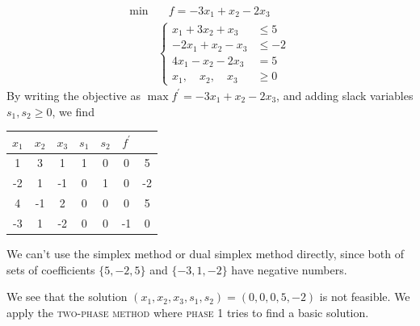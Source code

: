\begin{example}
    \begin{align}
        \min &\quad f = -3x_1 +x_2-2x_3\nonumber \\
        & \left\lbrace\begin{array}{ll}
        x_1+3x_2+x_3 &\le 5  \\
        -2x_1 + x_2 - x_3&\le -2\\
        4x_1 - x_2 -2x_3 & = 5\\
        x_1,\quad x_2,\quad x_3 &\ge 0
        \end{array}   \right.\label{1.11}
    \end{align}
    By writing the objective as $\max f^{\prime} = -3x_1+x_2-2x_3$, and adding slack variables $s_1, s_2\ge 0$, we find
    \begin{table}[H]
        \centering
        \begin{tabular}{|cccccc|c|}
        \hline
        $x_1$ & $x_2$ & $x_3$ & $s_1$ & $s_2$ & $f^{\prime}$ & \\ \hline
        1 & 3 & 1 & 1 & 0 & 0 & 5 \\
        -2 & 1 & -1 & 0 & 1 & 0 & -2\\ 
        4 & -1 & 2 & 0 & 0 & 0 & 5\\ \hline
        -3 & 1 & -2 & 0 & 0 & -1 & 0 \\ \hline
        \end{tabular}
        \label{tab-11-1}
    \end{table}
\end{example}

We can't use the simplex method or dual simplex method directly, since both of sets of coefficients $\{5, -2, 5\}$ and $\{-3, 1, -2\}$ have negative numbers.

We see that the solution $\left(x_1, x_2, x_3, s_1, s_2\right) = \left(0, 0, 0, 5, -2\right)$ is not feasible. We apply the \textcolor{MarkerColour}{\textsc{two-phase method}} where \textcolor{MarkerColour}{\textsc{phase 1}} tries to find a basic solution.

